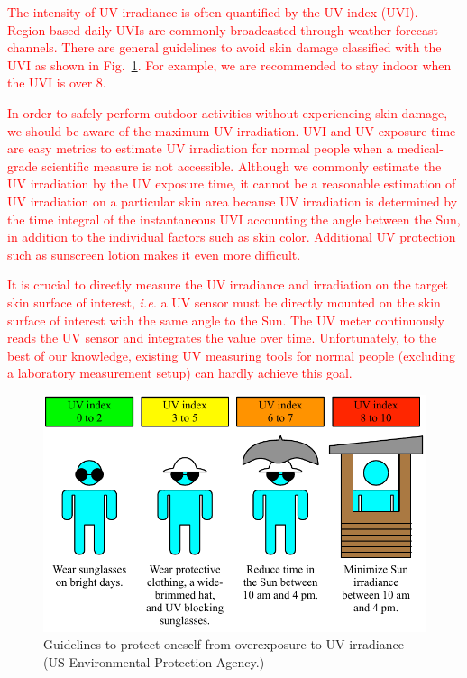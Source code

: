 \documentclass[journal]{IEEEtran}
\begin{document}
\textcolor{red}{The intensity of UV irradiance is often quantified by the UV index (UVI). Region-based daily UVIs are commonly broadcasted through weather forecast channels. There are general guidelines to avoid skin damage classified with the UVI as shown in Fig.~\ref{fig:guidelines}. For example, we are recommended to stay indoor when the UVI  is over 8.} 

\textcolor{red}{In order to safely perform outdoor activities without experiencing skin damage, we should be aware of  the maximum UV irradiation. UVI and UV exposure time are easy metrics to estimate UV irradiation for normal people when a medical-grade scientific measure is not accessible. Although we commonly estimate the UV irradiation by the UV exposure time, it cannot be a reasonable estimation of UV irradiation on a particular skin area because UV irradiation is determined by the time integral of the instantaneous UVI accounting the angle between the Sun, in addition to the individual factors such as skin color. Additional UV protection such as sunscreen lotion makes it even more difficult.} 

\textcolor{red}{It is crucial to directly measure the UV irradiance and irradiation on the target skin surface of interest, \textit{i.e.} a UV sensor must be directly mounted on the skin surface of interest with the same angle to the Sun. The UV meter continuously reads the UV sensor and integrates the value over time. Unfortunately, to the best of our knowledge, existing UV measuring tools for normal people (excluding a laboratory measurement setup) can hardly achieve this goal.}

\begin{figure}
\centering
\includegraphics[width=1.0\hsize]{Figures/UVI_guideline.pdf}
\caption{Guidelines to protect oneself from overexposure to UV irradiance (US Environmental Protection Agency.)}
\label{fig:guidelines}
\end{figure}
\end{document}
